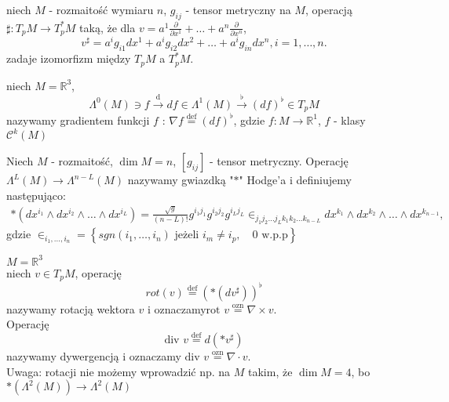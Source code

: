 \documentclass{article}
\begin{document}
\begin{definicja}niech $M$ - rozmaitość wymiaru $n$, $g_{ij}$ - tensor metryczny na $M$, operacją $\sharp: T_pM \to T_p^*M$ taką, że dla $v = a^1 \frac{\partial }{\partial x^1} + \ldots + a^n \frac{\partial }{\partial x^n} $,\\\[v^{\sharp}=a^ig_{i1}dx^1 + a^ig_{i2}dx^2 + \ldots + a^ig_{in}dx^n, i=1,\ldots,n.\]zadaje izomorfizm między $T_pM$ a $T_p^*M$.\end{definicja}
\begin{definicja}niech $M = \mathbb{R}^3$,\[\Lambda^0(M)\ni f \overset{\text{d}}{\to} df\in \Lambda^1(M) \overset{\flat}{\to} \left( df \right) ^\flat \in T_pM\]nazywamy gradientem funkcji $f$ : $\nabla f \overset{\text{def}}{=} \left( df \right) ^\flat$, gdzie $f: M\to \mathbb{R}^1$, $f$ - klasy $\mathcal{C}^k(M)$\end{definicja}\begin{definicja}Niech $M$ - rozmaitość, $\dim M = n$, $\left[ g_{ij} \right] $ - tensor metryczny. Operację $\Lambda^L(M)\to \Lambda^{n-L}(M)$ nazywamy gwiazdką "$\ast$" Hodge'a i definiujemy następująco:\begin{align*}\ast\left( dx^{i_1}\land dx^{i_2}\land \ldots \land dx^{i_L} \right) = \frac{\sqrt{g} }{(n-L)!} g^{i_1j_1}g^{i_2j_2}g^{i_Lj_L}\in _{j_1j_2\ldots j_L k_1k_2\ldots k_{n-L}}dx^{k_1}\land dx^{k_2}\land \ldots \land dx^{k_{n-1}},\end{align*}gdzie $\in _{i_1,\ldots,i_n} = \left\{ sgn(i_1,\ldots,i_n) \text{ jeżeli } i_m \neq i_p,\quad 0 \text{ w.p.p} \right\}$\end{definicja}\begin{definicja}$M = \mathbb{R}^3$\\niech $v\in T_pM$, operację\[rot(v) \overset{\text{def}}{=} \left( \ast\left( dv^\sharp \right)  \right) ^\flat\]nazywamy rotacją wektora $v$ i oznaczamy$\text{rot } v \overset{\text{ozn}}{=} \nabla\times v$.\\Operację \[\text{div }v \overset{\text{def}}{=} d\left( \ast v^\sharp \right)\]nazywamy dywergencją i oznaczamy $\text{div }v \overset{\text{ozn}}{=} \nabla \cdot v$.\\Uwaga: rotacji nie możemy wprowadzić np. na $M$ takim, że $\dim M = 4$, bo $\ast(\Lambda^2(M))\to \Lambda^2(M)$\end{definicja}
\end{document}
